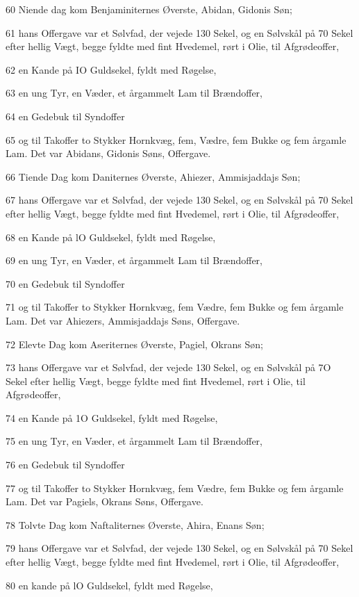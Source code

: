 \par 60 Niende dag kom Benjaminiternes Øverste, Abidan, Gidonis Søn;
\par 61 hans Offergave var et Sølvfad, der vejede 130 Sekel, og en Sølvskål på 70 Sekel efter hellig Vægt, begge fyldte med fint Hvedemel, rørt i Olie, til Afgrødeoffer,
\par 62 en Kande på IO Guldsekel, fyldt med Røgelse,
\par 63 en ung Tyr, en Væder, et årgammelt Lam til Brændoffer,
\par 64 en Gedebuk til Syndoffer
\par 65 og til Takoffer to Stykker Hornkvæg, fem, Vædre, fem Bukke og fem årgamle Lam. Det var Abidans, Gidonis Søns, Offergave.
\par 66 Tiende Dag kom Daniternes Øverste, Ahiezer, Ammisjaddajs Søn;
\par 67 hans Offergave var et Sølvfad, der vejede 130 Sekel, og en Sølvskål på 70 Sekel efter hellig Vægt, begge fyldte med fint Hvedemel, rørt i Olie, til Afgrødeoffer,
\par 68 en Kande på lO Guldsekel, fyldt med Røgelse,
\par 69 en ung Tyr, en Væder, et årgammelt Lam til Brændoffer,
\par 70 en Gedebuk til Syndoffer
\par 71 og til Takoffer to Stykker Hornkvæg, fem Vædre, fem Bukke og fem årgamle Lam. Det var Ahiezers, Ammisjaddajs Søns, Offergave.
\par 72 Elevte Dag kom Aseriternes Øverste, Pagiel, Okrans Søn;
\par 73 hans Offergave var et Sølvfad, der vejede 130 Sekel, og en Sølvskål på 7O Sekel efter hellig Vægt, begge fyldte med fint Hvedemel, rørt i Olie, til Afgrødeoffer,
\par 74 en Kande på 1O Guldsekel, fyldt med Røgelse,
\par 75 en ung Tyr, en Væder, et årgammelt Lam til Brændoffer,
\par 76 en Gedebuk til Syndoffer
\par 77 og til Takoffer to Stykker Hornkvæg, fem Vædre, fem Bukke og fem årgamle Lam. Det var Pagiels, Okrans Søns, Offergave.
\par 78 Tolvte Dag kom Naftaliternes Øverste, Ahira, Enans Søn;
\par 79 hans Offergave var et Sølvfad, der vejede 130 Sekel, og en Sølvskål på 70 Sekel efter hellig Vægt, begge fyldte med fint Hvedemel, rørt i Olie, til Afgrødeoffer,
\par 80 en kande på lO Guldsekel, fyldt med Røgelse,
